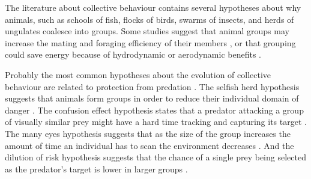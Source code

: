 The literature about collective behaviour contains several hypotheses about why animals, such as schools of fish, flocks of birds, swarms of insects, and herds of ungulates coalesce into groups. Some studies suggest that animal groups may increase the mating and foraging efficiency of their members \cite{krebs1994behavioural}, or that grouping could save energy because of hydrodynamic or aerodynamic benefits \cite{hemelrijk2014increased,marras2015fish,portugal2014upwash}.

Probably the most common hypotheses about the evolution of collective behaviour are related to protection from predation \cite{cresswell2011predicting,hart2005predator,krause2002living,larsson2012why,lebarbajec2009organized,nishimura2002predator,pavlov2000patterns}. The selfish herd hypothesis suggests that animals form groups in order to reduce their individual domain of danger \cite{hamilton1971geometry,kimbell2015selfish,morrell2015consequences}. The confusion effect hypothesis states that a predator attacking a group of visually similar prey might have a hard time tracking and capturing its target \cite{demsar2015simulating,kunz2006prey,nishimura2002predator,olson2013predator,olson2016evolution,zheng2005behavior}. The many eyes hypothesis suggests that as the size of the group increases the amount of time an individual has to scan the environment decreases \cite{haley2014exploring,ruxton2008application}. And the dilution of risk hypothesis suggests that the chance of a single prey being selected as the predator's target is lower in larger groups \cite{tosh2011conditions}.

